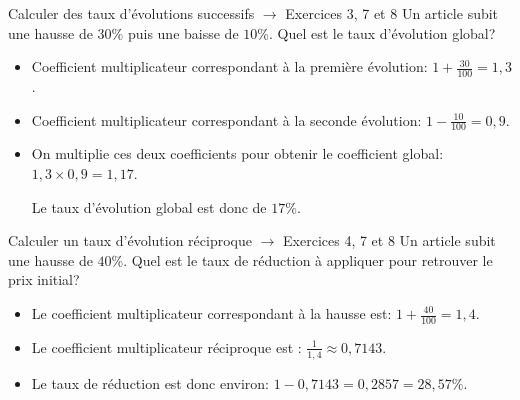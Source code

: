\documentclass[a4paper]{article}
\begin{document}
  \begin{methode*}[sidebyside, righthand width=2.2cm,segmentation code={}]{Calculer des taux d'évolutions successifs $\longrightarrow$ Exercices 3, 7 et 8}{}
    Un article subit une hausse de $30\%$ puis une baisse de $10\%$. Quel est le taux d'évolution global?

    \begin{itemize}
     \item Coefficient multiplicateur correspondant à la première évolution: $1 + \frac{30}{100} = 1,3$.
     \item Coefficient multiplicateur correspondant à la seconde évolution: $1 - \frac{10}{100} = 0,9$.
     \item On multiplie ces deux coefficients pour obtenir le coefficient global: $1,3 \times 0,9 = 1,17$.
     
     Le taux d'évolution global est donc de $17\%$.
    \end{itemize}
   \tcblower
   \vspace{1.1cm}
 \end{methode*}

 \begin{methode*}[sidebyside, righthand width=2.2cm,segmentation code={}]{Calculer un taux d'évolution réciproque $\longrightarrow$ Exercices 4, 7 et 8}{}
    Un article subit une hausse de $40\%$. Quel est le taux de réduction à appliquer pour retrouver le prix initial?
    
    \begin{itemize}
      \item Le coefficient multiplicateur correspondant à la hausse est: $1 + \frac{40}{100} = 1,4$.
      \item Le coefficient multiplicateur réciproque est : $\frac{1}{1,4} \approx 0,7143$.
      \item Le taux de réduction est donc environ: $1 - 0,7143 = 0,2857 = 28,57\%$.
    \end{itemize}
   \tcblower
   \vspace{1.1cm}
 \end{methode*}

  
  \medskip
  \setcounter{exercice}{0}
  
\end{document}

